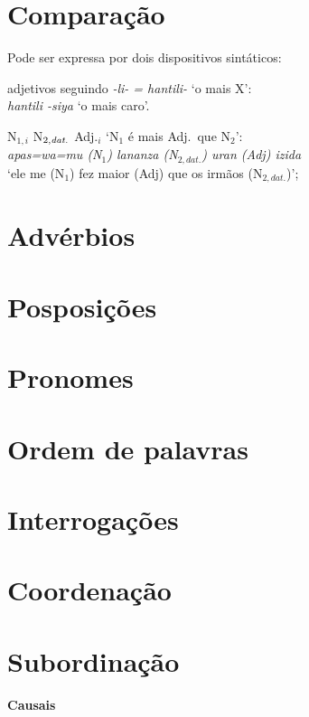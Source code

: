 \section{Comparação}
Pode ser expressa por dois dispositivos sintáticos:
\begin{compactenum}[(a)]
\item adjetivos seguindo \emph{-li- = hantili-} `o mais X':\\
	\emph{hantili -siya} `o mais caro'.
\item N$_{1,i}$ N$_{2,\emph{dat.}}$ Adj.$_i$ `N$_1$ é mais Adj.\ que N$_2$':\\
	\emph{apas=wa=mu \textnormal{(N$_1$)} lananza \textnormal{(N$_{2,dat.}$)} uran
	\textnormal{(Adj)} izida}\\
	`ele me (N$_1$) fez maior (Adj) que os irmãos (N$_{2,dat.}$)';
\end{compactenum}

\section{Advérbios}
\lipsum[1-2]

\section{Posposições}

\section{Pronomes}

\section{Ordem de palavras}

\section{Interrogações}

\section{Coordenação}

\section{Subordinação}

\paragraph{Causais}

